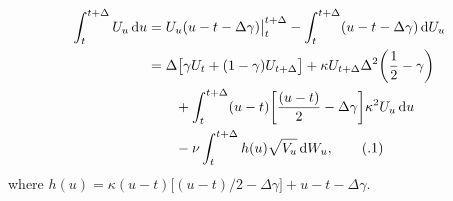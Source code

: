 \documentclass{ws-ijfe}
\newcommand\numberthis{\addtocounter{equation}{1}\tag{\theequation}}
\begin{document}
\begin{align*}
  \int_{t}^{t+\Delta}U_u\,\d u %
   & = U_u(u-t-\Delta\gamma)\big|_t^{t+\Delta}-\int_{t}^{t+\Delta}(u-t-\Delta\gamma)\,\d U_u \\
   & = \Delta\big[\gamma U_t+(1-\gamma ) U_{t+\Delta}\big]+\kappa U_{t+\Delta}\Delta^2\bigg(\frac{1}{2}-\gamma \bigg)\\
   &\quad\quad+\int_{t}^{t+\Delta}(u-t)\bigg[\frac{(u-t)}{2}-\Delta\gamma \bigg]\kappa^2U_u\,\d u\\
   &\quad\quad-\nu\int_{t}^{t+\Delta}h(u)\sqrt{V_u}\,\d W_u,\numberthis\label{appeqnU_t}
\end{align*}
where $h(u) =\kappa(u-t)\big[{(u-t)}/{2}-\Delta\gamma \big]+u-t-\Delta\gamma$.
\end{document}
